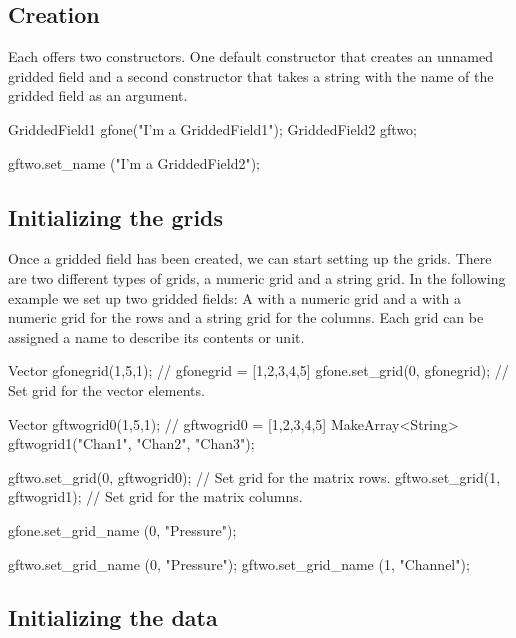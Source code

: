 \subsection{Creation}
\label{sec:griddedfields:create}

Each  offers two constructors. One default
constructor that creates an unnamed gridded field and a second constructor
that takes a string with the name of the gridded field as an argument.

\begin{code}
GriddedField1 gfone("I'm a GriddedField1");
GriddedField2 gftwo;

gftwo.set_name ("I'm a GriddedField2");
\end{code}


\subsection{Initializing the grids}
\label{sec:griddedfields:initgrids}

Once a gridded field has been created, we can start setting up the
grids. There are two different types of grids, a numeric grid and a
string grid. In the following example we set up two gridded fields: A
 with a numeric grid and a 
with a numeric grid for the rows and a string grid for the columns. Each grid
can be assigned a name to describe its contents or unit.

\begin{code}
Vector gfonegrid(1,5,1);        // gfonegrid = [1,2,3,4,5]
gfone.set_grid(0, gfonegrid);   // Set grid for the vector elements.

Vector gftwogrid0(1,5,1);       // gftwogrid0 = [1,2,3,4,5]
MakeArray<String> gftwogrid1("Chan1", "Chan2", "Chan3");

gftwo.set_grid(0, gftwogrid0);  // Set grid for the matrix rows.
gftwo.set_grid(1, gftwogrid1);  // Set grid for the matrix columns.

gfone.set_grid_name (0, "Pressure");

gftwo.set_grid_name (0, "Pressure");
gftwo.set_grid_name (1, "Channel");
\end{code}

\subsection{Initializing the data}
\label{sec:griddedfields:initdata}

